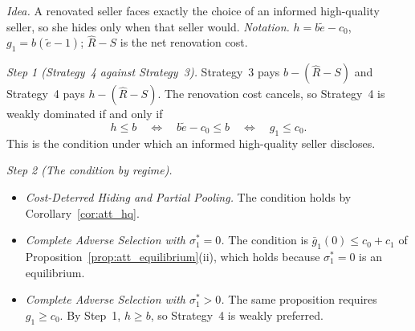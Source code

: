 \upshape
\emph{Idea.} A renovated seller faces exactly the choice of an informed high-quality seller, so she hides only when that seller would. \emph{Notation.} $h=b\tilde e-c_0$, $g_1=b(\tilde e-1)$; $\hat R-S$ is the net renovation cost.

\emph{Step 1 (Strategy~4 against Strategy~3).} Strategy~3 pays $b-(\hat R-S)$ and Strategy~4 pays $h-(\hat R-S)$. The renovation cost cancels, so Strategy~4 is weakly dominated if and only if
\begin{equation*}
    h\le b\quad\iff\quad b\tilde e-c_0\le b\quad\iff\quad g_1\le c_0.
\end{equation*}
This is the condition under which an informed high-quality seller discloses.

\emph{Step 2 (The condition by regime).}
\begin{itemize}
    \item \emph{Cost-Deterred Hiding and Partial Pooling.} The condition holds by Corollary~\ref{cor:att_hq}.
    \item \emph{Complete Adverse Selection with $\sigma_1^*=0$.} The condition is $\bar g_1(0)\le c_0+c_1$ of Proposition~\ref{prop:att_equilibrium}(ii), which holds because $\sigma_1^*=0$ is an equilibrium.
    \item \emph{Complete Adverse Selection with $\sigma_1^*>0$.} The same proposition requires $g_1\ge c_0$. By Step~1, $h\ge b$, so Strategy~4 is weakly preferred.
\end{itemize}
